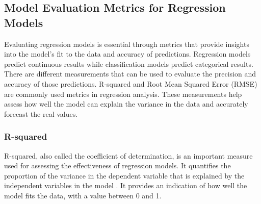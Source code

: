 \documentclass[12pt, a4paper,oneside]{book}
\numberwithin{equation}{section}
\begin{document}
\subsection{Model Evaluation Metrics for Regression Models}\label{sec:3.3.2}

Evaluating regression models is essential through metrics that provide insights into the model's fit to the data and accuracy of predictions. Regression models predict continuous results while classification models predict categorical results. There are different measurements that can be used to evaluate the precision and accuracy of those predictions. R-squared and Root Mean Squared Error (RMSE) are commonly used metrics in regression analysis. These measurements help assess how well the model can explain the variance in the data and accurately forecast the real values.

\subsubsection{R-squared}

R-squared, also called the coefficient of determination, is an important measure used for assessing the effectiveness of regression models. It quantifies the proportion of the variance in the dependent variable that is explained by the independent variables in the model \cite{draper1998} \cite{hastie2009}. It provides an indication of how well the model fits the data, with a value between 0 and 1.
\end{document}
